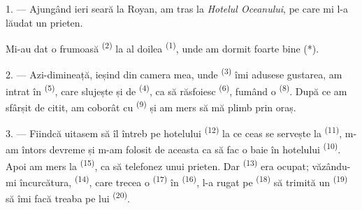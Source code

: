 %
%


\VUsaut{3.0mm}
\VUsaut{1.6mm}
\VUsaut{2.0mm}
\VUsaut{3.4mm}

1. --- Ajungând ieri seară la Royan, am tras la \textit{Hotelul Oceanului}, pe care
mi l-a lăudat un prieten.

Mi-au dat o  frumoasă \textsuperscript{(2)} la 
al doilea \textsuperscript{(1)}, unde am dormit foarte bine (*).

2. --- Azi-dimineață, ieșind din camera mea, unde 
\textsuperscript{(3)} îmi adusese gustarea, am intrat în 
\textsuperscript{(5)}, care slujește și de 
\textsuperscript{(4)}, ca să răsfoiesc  \textsuperscript{(6)},
fumând o  \textsuperscript{(8)}. După ce am sfârșit de citit, am
coborât cu  \textsuperscript{(9)} și am mers să mă plimb prin
oraș.

3. --- Fiindcă uitasem să îl întreb pe  hotelului
\textsuperscript{(12)} la ce ceas se servește la 
\textsuperscript{(11)}, m-am întors devreme și m-am folosit de aceasta ca să fac o
baie în  hotelului \textsuperscript{(10)}. Apoi am mers la
 \textsuperscript{(15)}, ca să telefonez unui prieten. Dar
 \textsuperscript{(13)} era ocupat; văzându-mi încurcătura,
 \textsuperscript{(14)}, care trecea o 
\textsuperscript{(17)} în  \textsuperscript{(16)}, l-a
rugat pe  \textsuperscript{(18)} să trimită un
 \textsuperscript{(19)} să îmi facă treaba pe
 lui \textsuperscript{(20)}.

